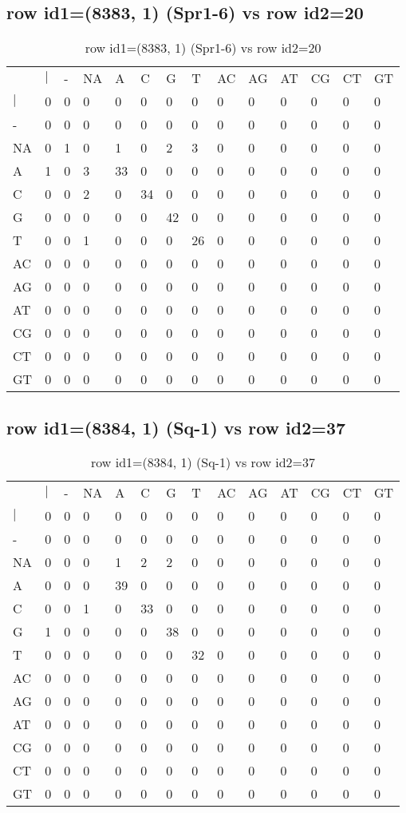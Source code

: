 \subsection{row id1=(8383, 1) (Spr1-6) vs row id2=20}
\begin{center}
\begin{longtable}{|l|l|l|l|l|l|l|l|l|l|l|l|l|l|}
\caption{row id1=(8383, 1) (Spr1-6) vs row id2=20} \label{table_dm426}\\
\hline
\\
\hline
&$|$&-&NA&A&C&G&T&AC&AG&AT&CG&CT&GT\\
$|$&0&0&0&0&0&0&0&0&0&0&0&0&0\\
-&0&0&0&0&0&0&0&0&0&0&0&0&0\\
NA&0&1&0&1&0&2&3&0&0&0&0&0&0\\
A&1&0&3&33&0&0&0&0&0&0&0&0&0\\
C&0&0&2&0&34&0&0&0&0&0&0&0&0\\
G&0&0&0&0&0&42&0&0&0&0&0&0&0\\
T&0&0&1&0&0&0&26&0&0&0&0&0&0\\
AC&0&0&0&0&0&0&0&0&0&0&0&0&0\\
AG&0&0&0&0&0&0&0&0&0&0&0&0&0\\
AT&0&0&0&0&0&0&0&0&0&0&0&0&0\\
CG&0&0&0&0&0&0&0&0&0&0&0&0&0\\
CT&0&0&0&0&0&0&0&0&0&0&0&0&0\\
GT&0&0&0&0&0&0&0&0&0&0&0&0&0\\
\hline
\end{longtable}
\end{center}

\subsection{row id1=(8384, 1) (Sq-1) vs row id2=37}
\begin{center}
\begin{longtable}{|l|l|l|l|l|l|l|l|l|l|l|l|l|l|}
\caption{row id1=(8384, 1) (Sq-1) vs row id2=37} \label{table_dm428}\\
\hline
\\
\hline
&$|$&-&NA&A&C&G&T&AC&AG&AT&CG&CT&GT\\
$|$&0&0&0&0&0&0&0&0&0&0&0&0&0\\
-&0&0&0&0&0&0&0&0&0&0&0&0&0\\
NA&0&0&0&1&2&2&0&0&0&0&0&0&0\\
A&0&0&0&39&0&0&0&0&0&0&0&0&0\\
C&0&0&1&0&33&0&0&0&0&0&0&0&0\\
G&1&0&0&0&0&38&0&0&0&0&0&0&0\\
T&0&0&0&0&0&0&32&0&0&0&0&0&0\\
AC&0&0&0&0&0&0&0&0&0&0&0&0&0\\
AG&0&0&0&0&0&0&0&0&0&0&0&0&0\\
AT&0&0&0&0&0&0&0&0&0&0&0&0&0\\
CG&0&0&0&0&0&0&0&0&0&0&0&0&0\\
CT&0&0&0&0&0&0&0&0&0&0&0&0&0\\
GT&0&0&0&0&0&0&0&0&0&0&0&0&0\\
\hline
\end{longtable}
\end{center}

